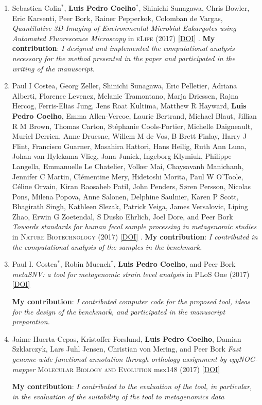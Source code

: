 \documentclass{article}
\newcommand\showdoi[1]{%
    \href{http://dx.doi.org/#1}{[DOI]}%
}
\newcommand\pubname[1]{\textsc{#1}}
\newcommand\contribution[1]{\relax\hfill\break\textbf{My contribution}: \textit{#1}}
\begin{document}
\begin{enumerate}[resume]
\item  Sebastien Colin${}^{*}$, \textbf{Luis Pedro Coelho}${}^{*}$,
Shinichi Sunagawa, Chris Bowler, Eric Karsenti, Peer Bork, Rainer Pepperkok,
Colomban de Vargas, \emph{Quantitative 3D-Imaging of Environmental Microbial
Eukaryotes using Automated Fluorescence Microscopy}
in \pubname{eLife} (2017) \showdoi{10.7554/eLife.26066.001}.
\contribution{I designed and implemented the computational analysis necessary
for the method presented in the paper and participated in the writing of the
manuscript.}

\item Paul I Costea, Georg Zeller, Shinichi Sunagawa, Eric Pelletier, Adriana
Alberti, Florence Levenez, Melanie Tramontano, Marja Driessen, Rajna Hercog,
Ferris-Elias Jung, Jens Roat Kultima, Matthew R Hayward, \textbf{Luis Pedro
Coelho}, Emma Allen-Vercoe, Laurie Bertrand, Michael Blaut, Jillian R M Brown,
Thomas Carton, Stéphanie Cools-Portier, Michelle Daigneault, Muriel Derrien,
Anne Druesne, Willem M de Vos, B Brett Finlay, Harry J Flint, Francisco
Guarner, Masahira Hattori, Hans Heilig, Ruth Ann Luna, Johan van Hylckama
Vlieg, Jana Junick, Ingeborg Klymiuk, Philippe Langella, Emmanuelle Le
Chatelier, Volker Mai, Chaysavanh Manichanh, Jennifer C Martin, Clémentine
Mery, Hidetoshi Morita, Paul W O'Toole, Céline Orvain, Kiran Raosaheb Patil,
John Penders, Søren Persson, Nicolas Pons, Milena Popova, Anne Salonen,
Delphine Saulnier, Karen P Scott, Bhagirath Singh, Kathleen Slezak, Patrick
Veiga, James Versalovic, Liping Zhao, Erwin G Zoetendal, S Dusko Ehrlich, Joel
Dore, and Peer Bork \emph{Towards standards for human fecal sample processing
in metagenomic studies} in \pubname{Nature Biotechnology} (2017)
\showdoi{10.1038/nbt.3960}.
\contribution{I contributed in the computational analysis of the samples in the
benchmark.}

\item Paul I. Costea${}^{*}$, Robin Muench${}^{*}$, \textbf{Luis Pedro Coelho},
and Peer Bork \emph{metaSNV: a tool for metagenomic strain level analysis} in
PLoS One (2017) \showdoi{10.1371/journal.pone.0182392}
\contribution{I contributed computer code for the proposed tool, ideas for the
design of the benchmark, and participated in the manuscript preparation.}

\item Jaime Huerta-Cepas, Kristoffer Forslund, \textbf{Luis Pedro Coelho},
Damian Szklarczyk, Lars Juhl Jensen, Christian von Mering, and Peer Bork
\emph{Fast genome-wide functional annotation through orthology assignment by
eggNOG-mapper} \pubname{Molecular Biology and Evolution} msx148 (2017)
\showdoi{10.1093/molbev/msx148}
\contribution{I contributed to the evaluation of the tool, in particular, in
the evaluation of the suitability of the tool to metagenomics data}


\end{enumerate}
\end{document}
